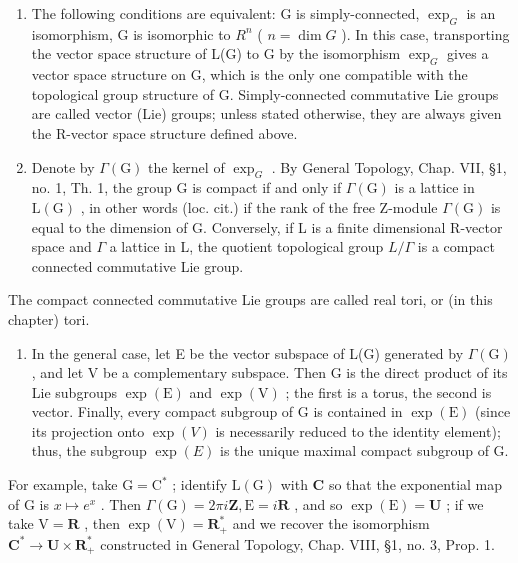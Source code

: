 \begin{enumerate}
\def\labelenumi{\alph{enumi})}
\item
  The following conditions are equivalent: G is simply-connected, \(\exp_{G}\) is an isomorphism, G is isomorphic to \(R^{n}\) ( \(n = \dim G\) ). In this case, transporting the vector space structure of L(G) to G by the isomorphism \(\exp_{G}\) gives a vector space structure on G, which is the only one compatible with the topological group structure of G. Simply-connected commutative Lie groups are called vector (Lie) groups; unless stated otherwise, they are always given the R-vector space structure defined above.
\item
  Denote by \(\Gamma(\mathrm{G})\) the kernel of \(\exp_{G}\) . By General Topology, Chap. VII, §1, no. 1, Th. 1, the group G is compact if and only if \(\Gamma(\mathrm{G})\) is a lattice in \(\mathrm{L}(\mathrm{G})\) , in other words (loc. cit.) if the rank of the free Z-module \(\Gamma(\mathrm{G})\) is equal to the dimension of G. Conversely, if L is a finite dimensional R-vector space and \(\Gamma\) a lattice in L, the quotient topological group \(L/\Gamma\) is a compact connected commutative Lie group.
\end{enumerate}

The compact connected commutative Lie groups are called real tori, or (in this chapter) tori.

\begin{enumerate}
\def\labelenumi{\alph{enumi})}
\setcounter{enumi}{2}
\tightlist
\item
  In the general case, let E be the vector subspace of L(G) generated by \(\Gamma(\mathrm{G})\) , and let V be a complementary subspace. Then G is the direct product of its Lie subgroups \(\exp(\mathrm{E})\) and \(\exp(\mathrm{V})\) ; the first is a torus, the second is vector. Finally, every compact subgroup of G is contained in \(\exp(\mathrm{E})\) (since its projection onto \(\exp(V)\) is necessarily reduced to the identity element); thus, the subgroup \(\exp(E)\) is the unique maximal compact subgroup of G.
\end{enumerate}

For example, take \(\mathrm{G} = \mathrm{C}^*\) ; identify \(\mathrm{L(G)}\) with \(\mathbf{C}\) so that the exponential map of \(\mathrm{G}\) is \(x \mapsto e^x\) . Then \(\Gamma(\mathrm{G}) = 2\pi i\mathbf{Z}, \mathrm{E} = i\mathbf{R}\) , and so \(\exp(\mathrm{E}) = \mathbf{U}\) ; if we take \(\mathrm{V} = \mathbf{R}\) , then \(\exp(\mathrm{V}) = \mathbf{R}_+^*\) and we recover the isomorphism \(\mathbf{C}^* \to \mathbf{U} \times \mathbf{R}_+^*\) constructed in General Topology, Chap. VIII, §1, no. 3, Prop. 1.

